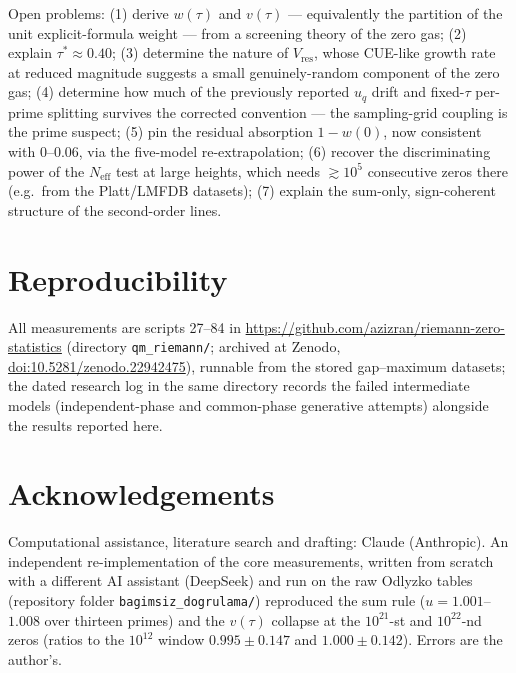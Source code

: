 \documentclass[12pt]{amsart}
\begin{document}
Open problems: (1) derive $w(\tau)$ and $v(\tau)$ --- equivalently the
partition of the unit explicit-formula weight --- from a screening theory
of the zero gas; (2) explain $\tau^* \approx 0.40$; (3) determine the
nature of $V_{\mathrm{res}}$, whose CUE-like growth rate at reduced
magnitude suggests a small genuinely-random component of the zero gas;
(4) determine how much of the previously reported $u_q$ drift and
fixed-$\tau$ per-prime splitting survives the corrected convention ---
the sampling-grid coupling is the prime suspect; (5) pin the residual
absorption $1 - w(0)$, now consistent with $0$--$0.06$, via the
five-model re-extrapolation;
(6) recover the discriminating power of the $N_{\mathrm{eff}}$ test at
large heights, which needs $\gtrsim 10^5$ consecutive zeros there
(e.g.\ from the Platt/LMFDB datasets); (7) explain the sum-only,
sign-coherent structure of the second-order lines.

\section*{Reproducibility}

All measurements are scripts 27--84 in
\url{https://github.com/azizran/riemann-zero-statistics} (directory
\texttt{qm\_riemann/}; archived at Zenodo,
\href{https://doi.org/10.5281/zenodo.22942475}{doi:10.5281/zenodo.22942475}),
runnable from the stored gap--maximum datasets; the dated research log in
the same directory records the failed intermediate models (independent-phase
and common-phase generative attempts) alongside the results reported here.

\section*{Acknowledgements}

Computational assistance, literature search and drafting: Claude
(Anthropic). An independent re-implementation of the core measurements, written from
scratch with a different AI assistant (DeepSeek) and run on the raw
Odlyzko tables (repository folder \texttt{bagimsiz\_dogrulama/}) reproduced the sum rule
($u = 1.001$--$1.008$ over thirteen primes) and the $v(\tau)$ collapse at
the $10^{21}$-st and $10^{22}$-nd zeros (ratios to the $10^{12}$ window
$0.995 \pm 0.147$ and $1.000 \pm 0.142$). Errors are the author's.
\end{document}
